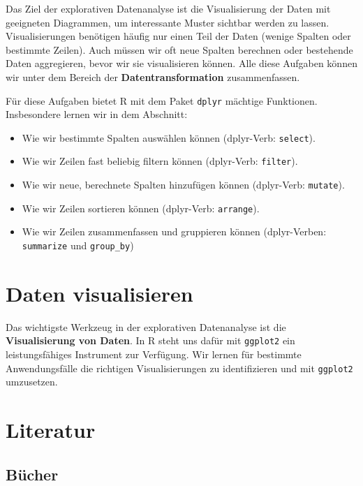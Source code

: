 \documentclass[
]{book}
\providecommand{\tightlist}{%
  \setlength{\itemsep}{0pt}\setlength{\parskip}{0pt}}
\begin{document}
Das Ziel der explorativen Datenanalyse ist die Visualisierung der Daten mit geeigneten Diagrammen, um interessante Muster sichtbar werden zu lassen. Visualisierungen benötigen häufig nur einen Teil der Daten (wenige Spalten oder bestimmte Zeilen). Auch müssen wir oft neue Spalten berechnen oder bestehende Daten aggregieren, bevor wir sie visualisieren können. Alle diese Aufgaben können wir unter dem Bereich der \textbf{Datentransformation} zusammenfassen.

Für diese Aufgaben bietet R mit dem Paket \texttt{dplyr} mächtige Funktionen. Insbesondere lernen wir in dem Abschnitt:

\begin{itemize}
\tightlist
\item
  Wie wir bestimmte Spalten auswählen können (dplyr-Verb: \texttt{select}).
\item
  Wie wir Zeilen fast beliebig filtern können (dplyr-Verb: \texttt{filter}).
\item
  Wie wir neue, berechnete Spalten hinzufügen können (dplyr-Verb: \texttt{mutate}).
\item
  Wie wir Zeilen sortieren können (dplyr-Verb: \texttt{arrange}).
\item
  Wie wir Zeilen zusammenfassen und gruppieren können (dplyr-Verben: \texttt{summarize} und \texttt{group\_by})
\end{itemize}

\hypertarget{daten-visualisieren}{%
\section{Daten visualisieren}\label{daten-visualisieren}}

Das wichtigste Werkzeug in der explorativen Datenanalyse ist die \textbf{Visualisierung von Daten}. In R steht uns dafür mit \texttt{ggplot2} ein leistungsfähiges Instrument zur Verfügung. Wir lernen für bestimmte Anwendungsfälle die richtigen Visualisierungen zu identifizieren und mit \texttt{ggplot2} umzusetzen.

\hypertarget{literatur}{%
\section{Literatur}\label{literatur}}

\hypertarget{buxfccher}{%
\subsection{Bücher}\label{buxfccher}}
\end{document}
